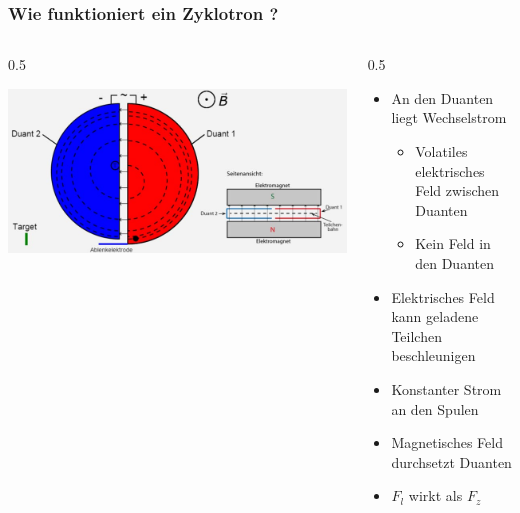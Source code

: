 \documentclass{beamer}
\begin{document}
\begin{frame}
\frametitle{Wie funktioniert ein Zyklotron ?}
  \begin{columns}[onlytextwidth,t]
    \begin{column} {0.5\textwidth}
      \begin{center}
         \includegraphics[width=\textwidth]{praes/Aufbau-Zyklotron-de.jpg}
         \footnotemark
        \end{center}
    \end{column}
    \begin{column} {0.5\textwidth}
      \begin{itemize}
        \item<1-> An den Duanten liegt Wechselstrom
        \begin{itemize}
          \item<2-> Volatiles elektrisches Feld zwischen Duanten
          \item<3-> Kein Feld in den Duanten
        \end{itemize}
        \item<4-> Elektrisches Feld kann geladene Teilchen beschleunigen
        \item<5-> Konstanter Strom an den Spulen
        \item<6-> Magnetisches Feld durchsetzt Duanten
        \item<7-> $F_l$ wirkt als $F_z$
      \end{itemize}
    \end{column}
  \end{columns}
\end{frame}
\end{document}
